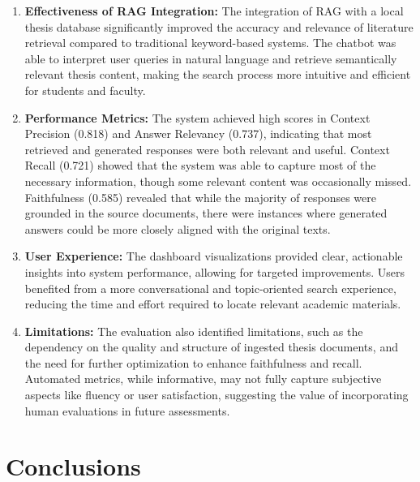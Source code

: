 \begin{refsection}
\begin{enumerate}
    \item \textbf{Effectiveness of RAG Integration:} The integration of RAG with a local thesis database significantly improved the accuracy and relevance of literature retrieval compared to traditional keyword-based systems. The chatbot was able to interpret user queries in natural language and retrieve semantically relevant thesis content, making the search process more intuitive and efficient for students and faculty.
    \item \textbf{Performance Metrics:} The system achieved high scores in Context Precision (0.818) and Answer Relevancy (0.737), indicating that most retrieved and generated responses were both relevant and useful. Context Recall (0.721) showed that the system was able to capture most of the necessary information, though some relevant content was occasionally missed. Faithfulness (0.585) revealed that while the majority of responses were grounded in the source documents, there were instances where generated answers could be more closely aligned with the original texts.
    \item \textbf{User Experience:} The dashboard visualizations provided clear, actionable insights into system performance, allowing for targeted improvements. Users benefited from a more conversational and topic-oriented search experience, reducing the time and effort required to locate relevant academic materials.
    \item \textbf{Limitations:} The evaluation also identified limitations, such as the dependency on the quality and structure of ingested thesis documents, and the need for further optimization to enhance faithfulness and recall. Automated metrics, while informative, may not fully capture subjective aspects like fluency or user satisfaction, suggesting the value of incorporating human evaluations in future assessments.
\end{enumerate}

\section*{Conclusions}


\end{refsection}
